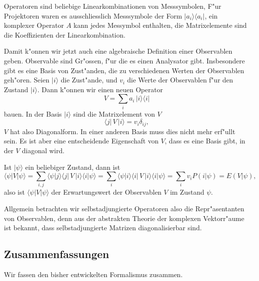 Operatoren sind beliebige Linearkombinationen von Messsymbolen,
F"ur Projektoren waren es ausschliesslich Messsymbole der Form
$|a_i\rangle\langle a_i|$, ein komplexer Operator $A$ kann jedes
Messymbol enthalten, die Matrixelemente sind die Koeffizienten 
der Linearkombination.

Damit k"onnen wir jetzt auch eine algebraische Definition einer
Observablen geben. Observable sind Gr"ossen, f"ur die es einen
Analysator gibt. Insbesondere gibt es eine Basis von Zust"anden,
die zu verschiedenen Werten der Observablen geh"oren.
Seien $|i\rangle$ die Zust"ande, und $v_i$ die Werte der Observablen
f"ur den Zustand $|i\rangle$. Dann k"onnen wir einen neuen
Operator
\[
V = \sum_{i} a_i\, |i\rangle\langle i|
\]
bauen. In der Basis $|i\rangle$ sind die Matrixelement von $V$
\[
\langle j|\,V\,|i\rangle = v_i\delta_{ij},
\]
$V$ hat also Diagonalform. In einer anderen Basis muss dies nicht
mehr erf"ullt sein. Es ist aber eine entscheidende Eigenschaft 
von $V$, dass es eine Basis gibt, in der $V$ diagonal wird.

Ist $|\psi\rangle$ ein beliebiger Zustand, dann ist
\[
\langle\psi|V|\psi\rangle
=
\sum_{i,j}\langle \psi|j\rangle\langle j|\,V\,|i\rangle\langle i|\psi\rangle
=
\sum_i\langle \psi|i\rangle\langle i|\,V\,|i\rangle\langle i|\psi\rangle
=
\sum_i v_i P(i|\psi)=E(V|\psi),
\]
also ist $\langle \psi|V|\psi\rangle$ der Erwartungswert der Observablen
$V$ im Zustand $\psi$.

Allgemein betrachten wir selbstadjungierte Operatoren also 
die Repr"asentanten von Observablen, denn aus der abstrakten
Theorie der komplexen Vektorr"aume ist bekannt, dass selbstadjungierte
Matrizen diagonalisierbar sind.

\subsection{Zusammenfassungen}
Wir fassen den bisher entwickelten Formalismus zusammen.

